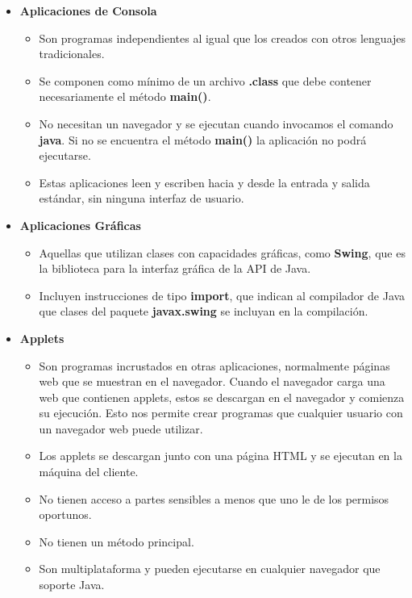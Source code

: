 \begin{itemize}
    \item \textbf{Aplicaciones de Consola}
    \begin{itemize}
        \item Son programas independientes al igual que los creados con otros lenguajes tradicionales.
        \item Se componen como mínimo de un archivo \textbf{.class} que debe contener necesariamente el método \textbf{main()}.
        \item No necesitan un navegador y se ejecutan cuando invocamos el comando \textbf{java}. Si no se encuentra el método \textbf{main()} la aplicación no podrá ejecutarse.
        \item Estas aplicaciones leen y escriben hacia y desde la entrada y salida estándar, sin ninguna interfaz de usuario.
    \end{itemize}

    \item \textbf{Aplicaciones Gráficas}
    \begin{itemize}
        \item Aquellas que utilizan clases con capacidades gráficas, como \textbf{Swing}, que es la biblioteca para la interfaz gráfica de la API de Java.
        \item Incluyen instrucciones de tipo \textbf{import}, que indican al compilador de Java que clases del paquete \textbf{javax.swing} se incluyan en la compilación.
    \end{itemize}

    \item \textbf{Applets}
    \begin{itemize}
        \item Son programas incrustados en otras aplicaciones, normalmente páginas web que se muestran en el navegador. Cuando el navegador carga una web que contienen applets, estos se descargan en el navegador y comienza su ejecución. Esto nos permite crear programas que cualquier usuario con un navegador web puede utilizar.
        \item Los applets se descargan junto con una página HTML y se ejecutan en la máquina del cliente.
        \item No tienen acceso a partes sensibles a menos que uno le de los permisos oportunos.
        \item No tienen un método principal.
        \item Son multiplataforma y pueden ejecutarse en cualquier navegador que soporte Java.
    \end{itemize}


\end{itemize}

